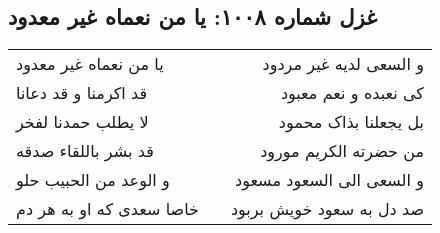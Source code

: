 \begin{center}
\section*{غزل شماره ۱۰۰۸: یا من نعماه غیر معدود}
\label{sec:1008}
\begin{longtable}{l p{0.5cm} r}
یا من نعماه غیر معدود
&&
و السعی لدیه غیر مردود
\\
قد اکرمنا و قد دعانا
&&
کی نعبده و نعم معبود
\\
لا یطلب حمدنا لفخر
&&
بل یجعلنا بذاک محمود
\\
قد بشر باللقاء صدقه
&&
من حضرته الکریم مورود
\\
و الوعد من الحبیب حلو
&&
و السعی الی السعود مسعود
\\
خاصا سعدی که او به هر دم
&&
صد دل به سعود خویش بربود
\\
\end{longtable}
\end{center}
